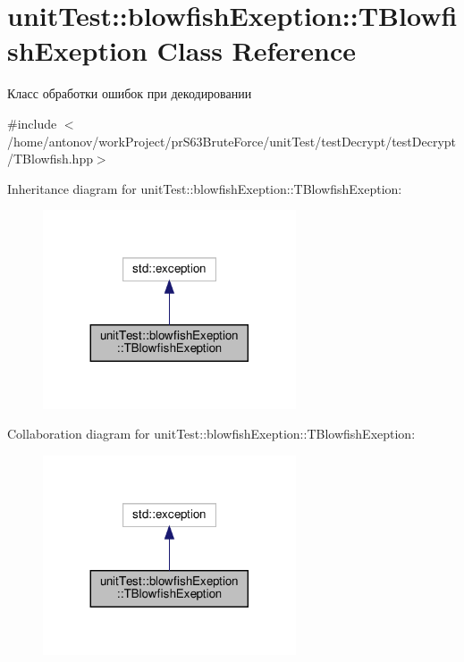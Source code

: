 \hypertarget{classunit_test_1_1blowfish_exeption_1_1_t_blowfish_exeption}{}\section{unit\+Test\+:\+:blowfish\+Exeption\+:\+:T\+Blowfish\+Exeption Class Reference}
\label{classunit_test_1_1blowfish_exeption_1_1_t_blowfish_exeption}


Класс обработки ошибок при декодировании  




{\ttfamily \#include $<$/home/antonov/work\+Project/pr\+S63\+Brute\+Force/unit\+Test/test\+Decrypt/test\+Decrypt/\+T\+Blowfish.\+hpp$>$}



Inheritance diagram for unit\+Test\+:\+:blowfish\+Exeption\+:\+:T\+Blowfish\+Exeption\+:\nopagebreak
\begin{figure}[H]
\begin{center}
\leavevmode
\includegraphics[width=212pt]{classunit_test_1_1blowfish_exeption_1_1_t_blowfish_exeption__inherit__graph}
\end{center}
\end{figure}


Collaboration diagram for unit\+Test\+:\+:blowfish\+Exeption\+:\+:T\+Blowfish\+Exeption\+:\nopagebreak
\begin{figure}[H]
\begin{center}
\leavevmode
\includegraphics[width=212pt]{classunit_test_1_1blowfish_exeption_1_1_t_blowfish_exeption__coll__graph}
\end{center}
\end{figure}
